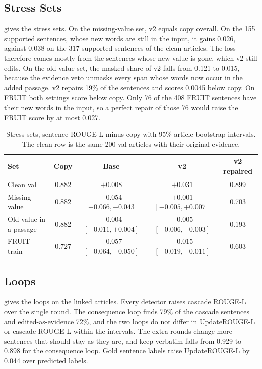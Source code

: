 \documentclass[]{paper}
\begin{document}
\subsection{Stress Sets}

 gives the stress sets. On the missing-value set, v2 equals copy overall. On the 155 supported sentences, whose new words are still in the input, it gains 0.026, against 0.038 on the 317 supported sentences of the clean articles. The loss therefore comes mostly from the sentences whose new value is gone, which v2 still edits. On the old-value set, the masked share of v2 falls from 0.121 to 0.015, because the evidence veto unmasks every span whose words now occur in the added passage. v2 repairs 19\% of the sentences and scores 0.0045 below copy. On FRUIT both settings score below copy. Only 76 of the 408 FRUIT sentences have their new words in the input, so a perfect repair of those 76 would raise the FRUIT score by at most 0.027.

\begin{table}[H]
\caption{Stress sets, sentence ROUGE-L minus copy with 95\% article bootstrap intervals. The clean row is the same 200 val articles with their original evidence.}
\label{tab:stress}
\centering
\footnotesize
\begin{tabular}{lcccc}
\toprule
Set & Copy & Base & v2 & v2 repaired \\
\midrule
Clean val & 0.882 & $+0.008$ & $+0.031$ & 0.899 \\
Missing value & 0.882 & $-0.054$ $[-0.066, -0.043]$ & $+0.001$ $[-0.005, +0.007]$ & 0.703 \\
Old value in a passage & 0.882 & $-0.004$ $[-0.011, +0.004]$ & $-0.005$ $[-0.006, -0.003]$ & 0.193 \\
FRUIT train & 0.727 & $-0.057$ $[-0.064, -0.050]$ & $-0.015$ $[-0.019, -0.011]$ & 0.603 \\
\bottomrule
\end{tabular}
\end{table}

\subsection{Loops}

 gives the loops on the linked articles. Every detector raises cascade ROUGE-L over the single round. The consequence loop finds 79\% of the cascade sentences and edited-as-evidence 72\%, and the two loops do not differ in UpdateROUGE-L or cascade ROUGE-L within the intervals. The extra rounds change more sentences that should stay as they are, and keep verbatim falls from 0.929 to 0.898 for the consequence loop. Gold sentence labels raise UpdateROUGE-L by 0.044 over predicted labels.
\end{document}
